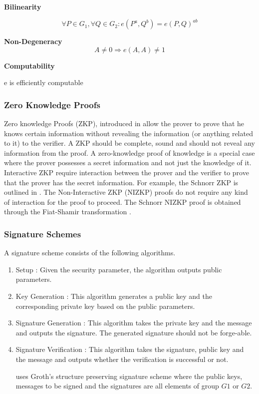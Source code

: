 \documentclass[journal]{IEEEtran}
\begin{document}
\textbf{Bilinearity}

$$\forall P \in G_1, \forall Q \in G_2 : e(P^a, Q^b) = e(P,Q)^{ab}$$

\textbf{Non-Degeneracy}
$$ A \neq 0 \Rightarrow e(A,A) \neq 1$$

\textbf{Computability}

e is efficiently computable

\subsubsection{Zero Knowledge Proofs}
Zero knowledge Proofs (ZKP), introduced in \cite{zkp} allow the prover to prove that he knows certain information without revealing the information (or anything related to it) to the verifier. A ZKP should be complete, sound and should not reveal any information from the proof. A zero-knowledge proof of knowledge is a special case where the prover possesses a secret information and not just the knowledge of it. Interactive ZKP require interaction between the prover and the verifier to prove that the prover has the secret information. For example, the Schnorr ZKP is outlined in \cite{rfc8235}. The Non-Interactive ZKP (NIZKP) proofs do not require any kind of interaction for the proof to proceed. The Schnorr NIZKP proof is obtained through the Fiat-Shamir transformation \cite{Fiat1986HowTP}.

\subsubsection{Signature Schemes}
A signature scheme consists of the following algorithms.
\begin{enumerate}[label=\alph*)]
	\item Setup : Given the security parameter, the algorithm outputs public parameters.
	\item Key Generation : This algorithm generates a public key and the corresponding private key based on the public parameters.
	\item Signature Generation : This algorithm takes the private key and the message and outputs the signature. The generated signature should not be forge-able.
	\item Signature Verification : This algorithm takes the signature, public key and the message and outputs whether the verification is successful or not.
	
\cite{CamenischDD17} uses Groth's structure preserving signature scheme \cite{groth} where the public keys, messages to be signed and the signatures are all elements of group $G1$ or $G2$.

\end{enumerate}
\end{document}
